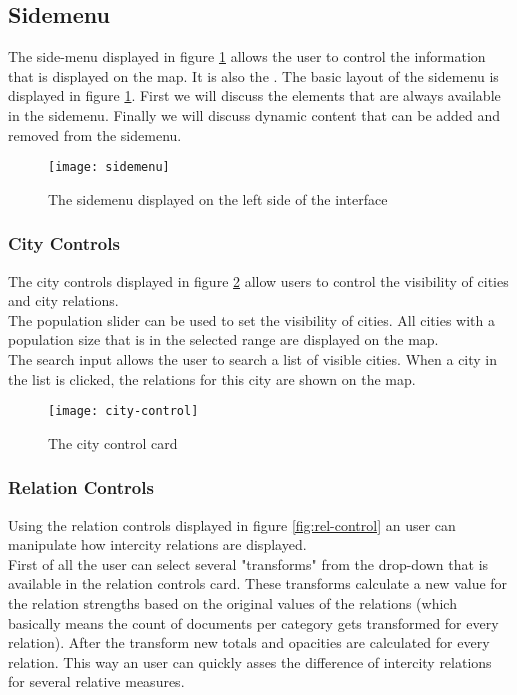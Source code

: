 \subsection{Sidemenu}
The side-menu displayed in figure \ref{fig:sidemenu} allows the user to control the information that is displayed on the map. It is also the . The basic layout of the sidemenu is displayed in figure \ref{fig:sidemenu}. First we will discuss the elements that are always available in the sidemenu. Finally we will discuss dynamic content that can be added and removed from the sidemenu.

\begin{figure}[H]
    \centering
    \texttt{[image: sidemenu]}
    \caption{The sidemenu displayed on the left side of the interface}
    \label{fig:sidemenu}
\end{figure}


\subsubsection{City Controls}
The city controls displayed in figure \ref{fig:city-control} allow users to control the visibility of cities and city relations.\\
The population slider can be used to set the visibility of cities. All cities with a population size that is in the selected range are displayed on the map.\\
The search input allows the user to search a list of visible cities. When a city in the list is clicked, the relations for this city are shown on the map.

\begin{figure}[H]
    \centering
    \texttt{[image: city-control]}
    \caption{The city control card}
    \label{fig:city-control}
\end{figure}

\subsubsection{Relation Controls}
Using the relation controls displayed in figure \ref{fig:rel-control} an user can manipulate how intercity relations are displayed.\\
First of all the user can select several "transforms" from the drop-down that is available in the relation controls card. These transforms calculate a new value for the relation strengths based on the original values of the relations (which basically means the count of documents per category gets transformed for every relation). After the transform new totals and opacities are calculated for every relation. This way an user can quickly asses the difference of intercity relations for several relative measures.\\

